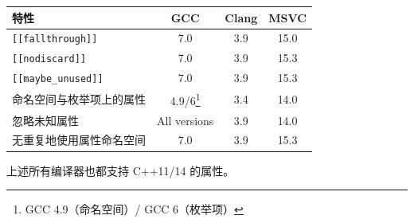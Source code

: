 \begin{table}[H]
\centering
\begin{tabularx}{\textwidth}{X c c c}
\toprule
特性 & GCC & Clang & MSVC \\
\midrule
\texttt{\texttt{[[fallthrough]]}} & 7.0 & 3.9 & 15.0 \\
\texttt{\texttt{[[nodiscard]]}} & 7.0 & 3.9 & 15.3 \\
\texttt{\texttt{[[maybe\_unused]]}} & 7.0 & 3.9 & 15.3 \\
命名空间与枚举项上的属性 & 4.9/6\footnote{GCC 4.9（命名空间）/ GCC 6（枚举项）} & 3.4 & 14.0 \\
忽略未知属性 & All versions & 3.9 & 14.0 \\
无重复地使用属性命名空间 & 7.0 & 3.9 & 15.3 \\
\bottomrule
\end{tabularx}
\end{table}

上述所有编译器也都支持 C++11/14 的属性。
